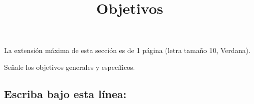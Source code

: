 \documentclass[10pt,prl]{revtex4}
\begin{document}
\title{Objetivos}
\maketitle

La extensi\'on m\'axima de esta secci\'on es de 1 p\'agina (letra tama\~no 10, Verdana).

Se\~nale los objetivos generales y espec\'ificos.

\maketitle
\subsection{Escriba bajo esta l\'inea:}
\end{document}
